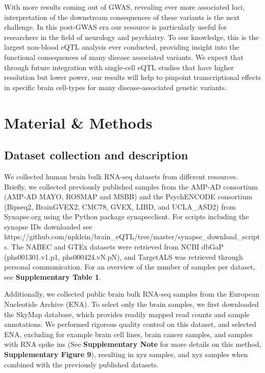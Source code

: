 With more results coming out of GWAS, revealing ever more associated loci, interpretation of the downstream consequences of these variants is the next challenge. In this post-GWAS era our resource is particularly useful for researchers in the field of neurology and psychiatry. To our knowledge, this is the largest non-blood eQTL analysis ever conducted, providing insight into the functional consequences of many disease associated variants. We expect that through future integration with single-cell eQTL studies that have higher resolution but lower power, our results will help to pinpoint transcriptional effects in specific brain cell-types for many disease-associated genetic variants. 

\section{Material \& Methods}
\subsection{Dataset collection and description }
We collected human brain bulk RNA-seq datasets from different resources. Briefly, we collected previously published samples from the AMP-AD consortium (AMP-AD MAYO\cite{hodesAcceleratingMedicinesPartnership2016}, ROSMAP\cite{hodesAcceleratingMedicinesPartnership2016} and MSBB\cite{hodesAcceleratingMedicinesPartnership2016}) and the PsychENCODE consortium (Bipseq2, BrainGVEX2, CMC78, GVEX, LIBD, and UCLA\_ASD2) from Synapse.org using the Python package synapseclient\cite{teamSynapseclientClientSynapse}. For scripts including the synapse IDs downloaded see https://github.com/npklein/brain\_eQTL/tree/master/synapse\_download\_scripts. The NABEC and GTEx datasets were retrieved from NCBI dbGaP (phs001301.v1.p1, phs000424.vN.pN), and TargetALS was retrieved through personal communication. For an overview of the number of samples per dataset, see \textbf{Supplementary Table 1}. 

Additionally, we collected public brain bulk RNA-seq samples from the European Nucleotide Archive (ENA). To select only the brain samples, we first downloaded the SkyMap database\cite{tsuiExtractingAllelicRead2018}, which provides readily mapped read counts and sample annotations. We performed rigorous quality control on this dataset, and selected ENA, excluding for example brain cell lines, brain cancer samples, and samples with RNA spike ins (See \textbf{Supplementary Note} for more details on this method, \textbf{Supplementary Figure 9}), resulting in xyz samples, and xyz samples when combined with the previously published datasets. 

